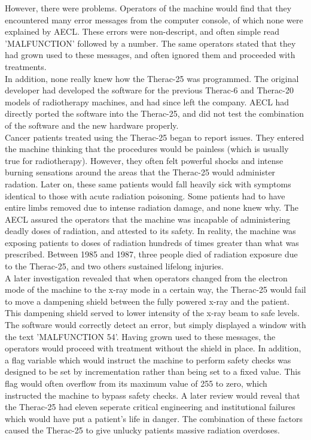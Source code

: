 \documentclass{article}
\begin{document}
However, there were problems. Operators of the machine would find that they encountered many error messages from the computer console, of which none were explained by AECL. These errors were non-descript, and often simple read 'MALFUNCTION' followed by a number. The same operators stated that they had grown used to these messages, and often ignored them and proceeded with treatments.\\

In addition, none really knew how the Therac-25 was programmed. The original developer had developed the software for the previous Therac-6 and Therac-20 models of radiotherapy machines, and had since left the company. AECL had directly ported the software into the Therac-25, and did not test the combination of the software and the new hardware properly.\\

Cancer patients treated using the Therac-25 began to report issues. They entered the machine thinking that the procedures would be painless (which is usually true for radiotherapy). However, they often felt powerful shocks and intense burning sensations around the areas that the Therac-25 would administer radation. Later on, these same patients would fall heavily sick with symptoms identical to those with acute radiation poisoning. Some patients had to have entire limbs removed due to intense radiation damage, and none knew why. The AECL assured the operators that the machine was incapable of administering deadly doses of radiation, and attested to its safety.\cite{leveson-turner-1993} In reality, the machine was exposing patients to doses of radiation hundreds of times greater than what was prescribed.\cite{baase-henry-2019} Between 1985 and 1987, three people died of radiation exposure due to the Therac-25, and two others sustained lifelong injuries.\\

A later investigation revealed that when operators changed from the electron mode of the machine to the x-ray mode in a certain way, the Therac-25 would fail to move a dampening shield between the fully powered x-ray and the patient. This dampening shield served to lower intensity of the x-ray beam to safe levels. The software would correctly detect an error, but simply displayed a window with the text 'MALFUNCTION 54'. Having grown used to these messages, the operators would proceed with treatment without the shield in place. In addition, a flag variable which would instruct the machine to perform safety checks was designed to be set by incrementation rather than being set to a fixed value. This flag would often overflow from its maximum value of 255 to zero, which instructed the machine to bypass safety checks. A later review would reveal that the Therac-25 had eleven seperate critical engineering and institutional failures which would have put a patient's life in danger. The combination of these factors caused the Therac-25 to give unlucky patients massive radiation overdoses.\\
\end{document}
